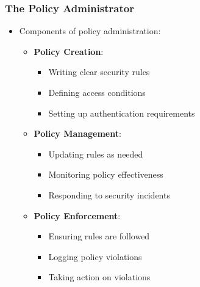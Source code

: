 \documentclass{beamer}
\begin{document}
\begin{frame}
    \frametitle{The Policy Administrator}
    \begin{itemize}
        \item Components of policy administration:
            \begin{itemize}
                \item \textbf{Policy Creation}:
                    \begin{itemize}
                        \item Writing clear security rules
                        \item Defining access conditions
                        \item Setting up authentication requirements
                    \end{itemize}
                \item \textbf{Policy Management}:
                    \begin{itemize}
                        \item Updating rules as needed
                        \item Monitoring policy effectiveness
                        \item Responding to security incidents
                    \end{itemize}
                \item \textbf{Policy Enforcement}:
                    \begin{itemize}
                        \item Ensuring rules are followed
                        \item Logging policy violations
                        \item Taking action on violations
                    \end{itemize}
            \end{itemize}
    \end{itemize}
\end{frame}
\end{document}

